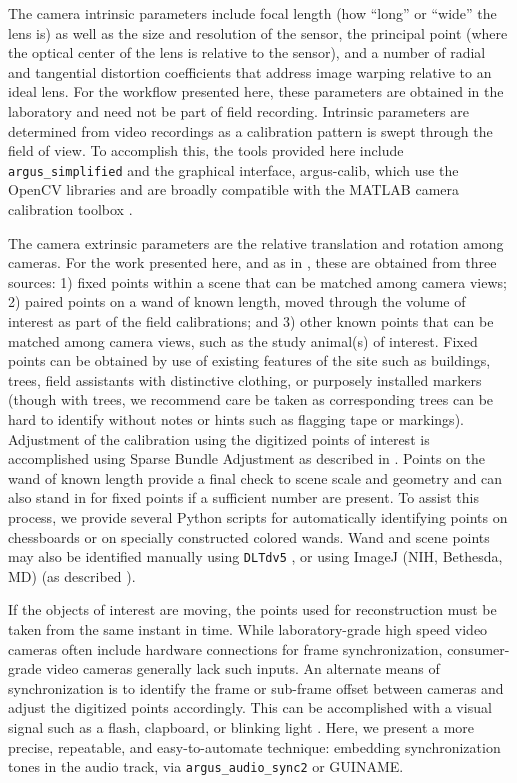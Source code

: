 \documentclass[fleqn,10pt]{wlpeerj}
\begin{document}
The camera intrinsic parameters include focal length (how ``long'' or ``wide'' the lens is) as well as the size and resolution of the sensor, the principal point (where the optical center of the lens is relative to the sensor), and a number of radial and tangential distortion coefficients that address image warping relative to an ideal lens. For the workflow presented here, these parameters are obtained in the laboratory and need not be part of field recording.  Intrinsic parameters are determined from video recordings as a calibration pattern is swept through the field of view.  To accomplish this, the tools provided here include \texttt{argus\_simplified} and the graphical interface, argus-calib, which use the OpenCV libraries \citep{opencv} and are broadly compatible with the MATLAB camera calibration toolbox \citep{lour09}.  

The camera extrinsic parameters are the relative translation and rotation among cameras.  For the work presented here, and as in \citep{Theriault:2014}, these are obtained from three sources: 1) fixed points within a scene that can be matched among camera views; 2) paired points on a wand of known length, moved through the volume of interest as part of the field calibrations; and 3) other known points that can be matched among camera views, such as the study animal(s) of interest. Fixed points can be obtained by use of existing features of the site such as buildings, trees, field assistants with distinctive clothing, or purposely installed markers (though with trees, we recommend care be taken as corresponding trees can be hard to identify without notes or hints such as flagging tape or markings).  Adjustment of the calibration using the digitized points of interest is accomplished using Sparse Bundle Adjustment as described in \citep{lour09, Theriault:2014}.  Points on the wand of known length provide a final check to scene scale and geometry and can also stand in for fixed points if a sufficient number are present. To assist this process, we provide several Python scripts for automatically identifying points on chessboards or on specially constructed colored wands. Wand and scene points may also be identified manually using \texttt{DLTdv5} \citep{Hedrick2008}, or using ImageJ (NIH, Bethesda, MD) (as described \citealp{Kane2012}).

If the objects of interest are moving, the points used for reconstruction must be taken from the same instant in time.  While laboratory-grade high speed video cameras often include hardware connections for frame synchronization, consumer-grade video cameras generally lack such inputs. An alternate means of synchronization is to identify the frame or sub-frame offset between cameras and adjust the digitized points accordingly.  This can be accomplished with a visual signal such as a flash, clapboard, or blinking light \citep{citations, Munk, Jusufi}.  Here, we present a more precise, repeatable, and easy-to-automate technique: embedding synchronization tones in the audio track, via \texttt{argus\_audio\_sync2} or GUINAME.  
\end{document}
